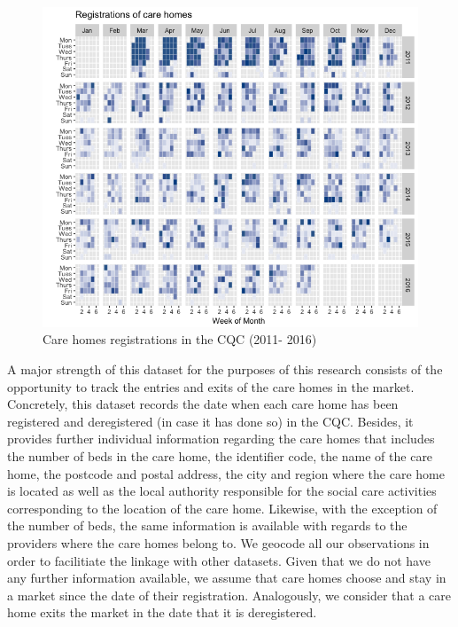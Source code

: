 \documentclass[12pt,letterpaper]{article}
\begin{document}
\begin{figure}[ht]
\includegraphics[width=1\textwidth]{registrations.png}
\caption{Care homes registrations in the CQC (2011- 2016)}
\label{fig: registrations}
\end{figure}


A major strength of this dataset for the purposes of this research consists of the opportunity to track the entries and exits of the care homes in the market. 
Concretely, this dataset records the date when each care home has been registered and deregistered (in case it has done so)
 in the CQC.  Besides, it provides further individual information regarding the care homes that includes 
the number of beds in the care home, the identifier code, the name of the care home, the postcode and postal 
address, the city and region where the care home is located as well as the local authority responsible for the 
social care activities corresponding to the location of the care home. Likewise, with the exception of the number of
 beds, the same information is available with regards to the providers where the care homes belong to. 
 We geocode all our observations in order to facilitiate the linkage with other 
 datasets.  Given that we do not have any further information available, we assume that care homes choose and stay in a market since the
       date of their registration. Analogously, we consider that a care home exits the market in the date that it is
        deregistered.
\end{document}
